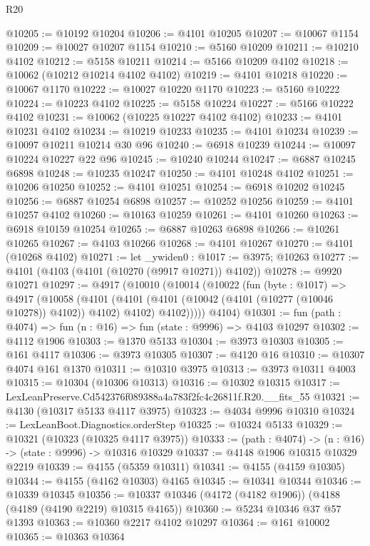 \begin{lexlean}{R20}
\begin{coremodule}
@10205 := @10192 @10204
@10206 := @4101 @10205
@10207 := @10067 @1154
@10209 := @10027 @10207 @1154
@10210 := @5160 @10209
@10211 := @10210 @4102
@10212 := @5158 @10211
@10214 := @5166 @10209 @4102
@10218 := @10062 (@10212 @10214 @4102 @4102)
@10219 := @4101 @10218
@10220 := @10067 @1170
@10222 := @10027 @10220 @1170
@10223 := @5160 @10222
@10224 := @10223 @4102
@10225 := @5158 @10224
@10227 := @5166 @10222 @4102
@10231 := @10062 (@10225 @10227 @4102 @4102)
@10233 := @4101 @10231 @4102
@10234 := @10219 @10233
@10235 := @4101 @10234
@10239 := @10097 @10211 @10214 @30 @96
@10240 := @6918 @10239
@10244 := @10097 @10224 @10227 @22 @96
@10245 := @10240 @10244
@10247 := @6887 @10245 @6898
@10248 := @10235 @10247
@10250 := @4101 @10248 @4102
@10251 := @10206 @10250
@10252 := @4101 @10251
@10254 := @6918 @10202 @10245
@10256 := @6887 @10254 @6898
@10257 := @10252 @10256
@10259 := @4101 @10257 @4102
@10260 := @10163 @10259
@10261 := @4101 @10260
@10263 := @6918 @10159 @10254
@10265 := @6887 @10263 @6898
@10266 := @10261 @10265
@10267 := @4103 @10266
@10268 := @4101 @10267
@10270 := @4101 (@10268 @4102)
@10271 := let _ywiden0 : @1017 := @3975; @10263
@10277 := @4101 (@4103 (@4101 (@10270 (@9917 @10271)) @4102))
@10278 := @9920 @10271
@10297 := @4917
    (@10010
      (@10014
        (@10022
          (fun (byte : @1017) =>
          @4917
            (@10058
              (@4101
                (@4101 (@4101 (@10042 (@4101 (@10277 (@10046 @10278)) @4102)) @4102) @4102)
                @4102)))))
      @4104)
@10301 := fun (path : @4074) => fun (n : @16) => fun (state : @9996) => @4103 @10297
@10302 := @4112 @1906
@10303 := @1370 @5133
@10304 := @3973 @10303
@10305 := @161 @4117
@10306 := @3973 @10305
@10307 := @4120 @16
@10310 := @10307 @4074 @161 @1370
@10311 := @10310 @3975
@10313 := @3973 @10311 @4003
@10315 := @10304 (@10306 @10313)
@10316 := @10302 @10315
@10317 := LexLeanPreserve.Cd542376f089388a4a783f2fc4c26811f.R20.__fits_55
@10321 := @4130 (@10317 @5133 @4117 @3975)
@10323 := @4034 @9996 @10310
@10324 := LexLeanBoot.Diagnostics.orderStep
@10325 := @10324 @5133
@10329 := @10321 (@10323 (@10325 @4117 @3975))
@10333 := (path : @4074) -> (n : @16) -> (state : @9996) -> @10316 @10329
@10337 := @4148 @1906 @10315 @10329 @2219
@10339 := @4155 (@5359 @10311)
@10341 := @4155 (@4159 @10305)
@10344 := @4155 (@4162 @10303) @4165
@10345 := @10341 @10344
@10346 := @10339 @10345
@10356 := @10337 @10346 (@4172 (@4182 @1906)) (@4188 (@4189 (@4190 @2219) @10315 @4165))
@10360 := @5234 @10346 @37 @57 @1393
@10363 := @10360 @2217 @4102 @10297
@10364 := @161 @10002
@10365 := @10363 @10364

\end{coremodule}
\end{lexlean}
